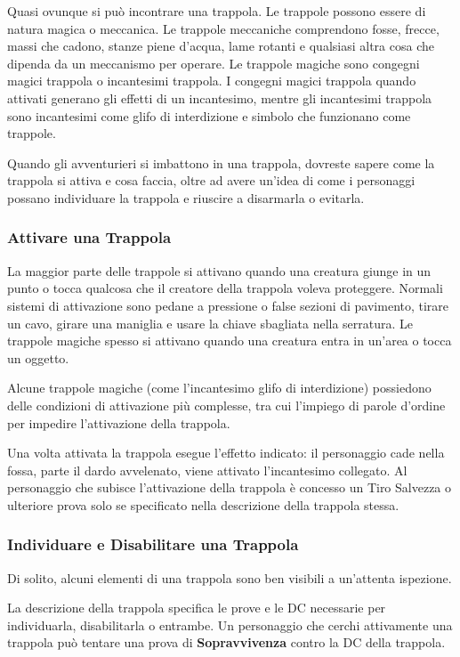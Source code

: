 \begin{multicols}{2}

Quasi ovunque si può incontrare una trappola. Le trappole possono essere di natura magica o meccanica. Le trappole meccaniche comprendono fosse, frecce, massi che cadono, stanze piene d'acqua, lame rotanti e qualsiasi altra cosa che dipenda da un meccanismo per operare. Le trappole magiche sono congegni magici trappola o incantesimi trappola. I congegni magici trappola quando attivati generano gli effetti di un incantesimo, mentre gli incantesimi trappola sono incantesimi come glifo di interdizione e simbolo che funzionano come trappole.

Quando gli avventurieri si imbattono in una trappola, dovreste sapere come la trappola si attiva e cosa faccia, oltre ad avere un'idea di come i personaggi possano individuare la trappola e riuscire a disarmarla o evitarla.

\subsubsection{Attivare una Trappola}
La maggior parte delle trappole si attivano quando una creatura giunge in un punto o tocca qualcosa che il creatore della trappola voleva proteggere. Normali sistemi di attivazione sono pedane a pressione o false sezioni di pavimento, tirare un cavo, girare una maniglia e usare la chiave sbagliata nella serratura. Le trappole magiche spesso si attivano quando una creatura entra in un'area o tocca un oggetto. 

Alcune trappole magiche (come l'incantesimo glifo di interdizione) possiedono delle condizioni di attivazione più complesse, tra cui l'impiego di parole d'ordine per impedire l'attivazione della trappola.

Una volta attivata la trappola esegue l'effetto indicato: il personaggio cade nella fossa, parte il dardo avvelenato, viene attivato l'incantesimo collegato. Al personaggio che subisce l'attivazione della trappola è concesso un Tiro Salvezza o ulteriore prova solo se specificato nella descrizione della trappola stessa.

\subsubsection{Individuare e Disabilitare una Trappola}
Di solito, alcuni elementi di una trappola sono ben visibili a un'attenta ispezione.

La descrizione della trappola specifica le prove e le DC necessarie per individuarla, disabilitarla o entrambe. Un personaggio che cerchi attivamente una trappola può tentare una prova di \textbf{Sopravvivenza} contro la DC della trappola.


\end{multicols}
